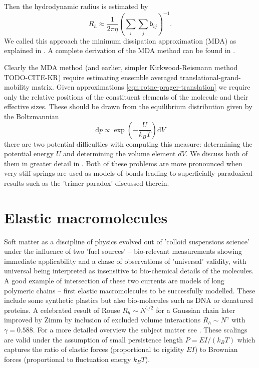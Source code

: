 \documentclass{doctoral}
\newcommand{\dd}{\mathrm{d}}
\newcommand{\mm}[1]{\bm{\mathsf{#1}}} %
\begin{document}
Then the hydrodynamic radius is estimated by
\begin{equation}
    R_h \approx \frac{1}{2 \pi \eta} \left( \sum_i \sum_j \mm{b}_{ij} \right)^{-1}.
\end{equation}
We called this approach the minimum dissipation approximation (MDA) as explained in \textcite{Waszkiewicz_2024_mda}.
A complete derivation of the MDA method can be found in \textcite{Cichocki_2019}.

Clearly the MDA method (and earlier, simpler Kirkwood-Reismann method TODO-CITE-KR) require estimating ensemble averaged translational-grand-mobility matrix.
Given approximations \eqref{eqn:rotne-prager-translation} we require only the relative positions of the constituent elements of the molecule and their effective sizes.
These should be drawn from the equilibrium distribution given by the Boltzmannian
\begin{equation}
    \dd p \propto \exp \left(- \frac{U}{k_B T} \right) \dd V
\end{equation}
there are two potential difficulties with computing this measure: determining the potential energy $U$ and determining the volume element $dV$.
We discuss both of them in greater detail in \textcite{Waszkiewicz_2024_trimer}.
Both of these problems are more pronounced when very stiff springs are used as models of bonds leading to superficially paradoxical results such as the 'trimer paradox' discussed therein.

\section{Elastic macromolecules}

Soft matter as a discipline of physics evolved out of 'colloid suspensions science' under the influence of two 'fuel sources' -- bio-relevant measurements showing immediate applicability and a chase of observations of 'universal' validity, with universal being interpreted as insensitive to bio-chemical details of the molecules.
A good example of intersection of these two currents are models of long polymeric chains -- first elastic macromolecules to be successfully modelled.
These include some synthetic plastics but also bio-molecules such as DNA or denatured proteins.
A celebrated result of Rouse $R_h \sim N^{1/2}$ for a Gaussian chain\cite{Rouse_1953} later improved by Zimm by inclusion of excluded volume interactions \cite{Zimm_1956} $R_h \sim N^\gamma$ with $\gamma=0.588$.
For a more detailed overview the subject matter see \textcite[chapter 3]{Dhont_2008}.
These scalings are valid under the assumption of small persistence length $P = EI / (k_B T)$ which captures the ratio of elastic forces (proportional to rigidity $EI$) to Brownian forces (proportional to fluctuation energy $k_B T$).
\end{document}
